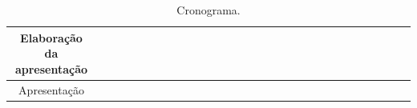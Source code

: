 \begin{table}[h!]
{\begin{tabular}{|c|cccc|cccc|cccc|cccc|cccc|cccc|cccc|}
Elaboração da apresentação    &  &                          &                          &                          &                          &                          &                          &                          &                          &                          &                          &                          &                          &                          &                          &                          &                          &                          &                          &                          &                          &                          & \cellcolor[HTML]{3166FF} & \cellcolor[HTML]{3166FF} &                          &  &  &  \\ \hline
Apresentação                  &  &                          &                          &                          &                          &                          &                          &                          &                          &                          &                          &                          &                          &                          &                          &                          &                          &                          &                          &                          &                          &                          &                          &                          & \cellcolor[HTML]{3166FF} &  &  &  \\ \hline
\end{tabular}%
}
\caption{Cronograma.}
\label{tab:cronograma}
\end{table}




